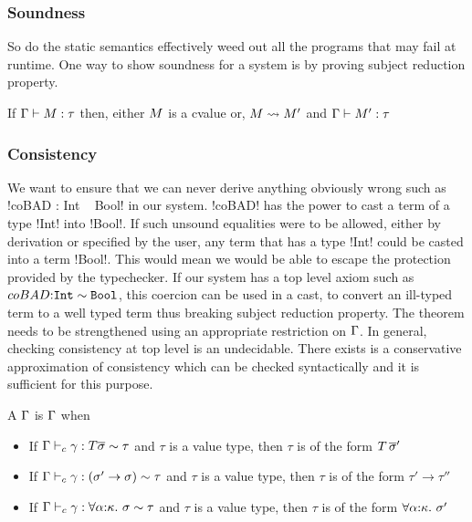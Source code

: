 \documentclass[manuscript,screen,nonacm]{acmart}
\begin{document}
\subsubsection{Soundness}
So do the static semantics effectively weed out all the programs that may fail at runtime. One way to show soundness for a system is by proving subject reduction property.

\begin{theorem}
 If $\Gamma \vdash M : \tau$ then, either $M$ is a cvalue or, $M \rightsquigarrow M'$ and
 $\Gamma \vdash M' : \tau$
\end{theorem}

\subsubsection{Consistency}
We want to ensure that we can never derive anything obviously wrong such as !coBAD : Int ~ Bool! in our system.
!coBAD! has the power to cast a term of a type !Int! into !Bool!. If such unsound equalities were to be allowed, either by derivation or specified by the user, any term that has a type !Int! could be casted into a term !Bool!. This would mean we would be able to escape the protection provided by the typechecker.
If our system has a top level axiom such as $coBAD {:} \texttt{Int} \sim \texttt{Bool}$, this coercion can be used in a cast, to convert an ill-typed term to a well typed term thus breaking subject reduction property. The theorem needs to be strengthened using an appropriate restriction on $\TEnv$. In general, checking consistency at top level is an undecidable. There exists is a conservative approximation of consistency which can be checked syntactically and it is sufficient for this purpose.

\begin{definition}[\Good $\TEnv$]
 A $\TEnv$ is \Good $\TEnv$ when
 \begin{itemize}
 \item If $\Gamma \vdash_{c} \gamma : T \overline{\sigma} \sim \tau$ and $\tau$ is a value type, then $\tau$ is of the form $T\,\overline{\sigma}'$
 \item If $\Gamma \vdash_{c} \gamma : (\sigma' \to \sigma) \sim \tau$ and $\tau$ is a value type, then $\tau$ is of the form $\tau' \to \tau''$
 \item If $\Gamma \vdash_{c} \gamma : \forall\alpha{:}\kappa.~\sigma \sim \tau$ and $\tau$ is a value type, then $\tau$ is of the form $\forall\alpha{:}\kappa.~\sigma'$
 \end{itemize}
\end{definition}
\end{document}
